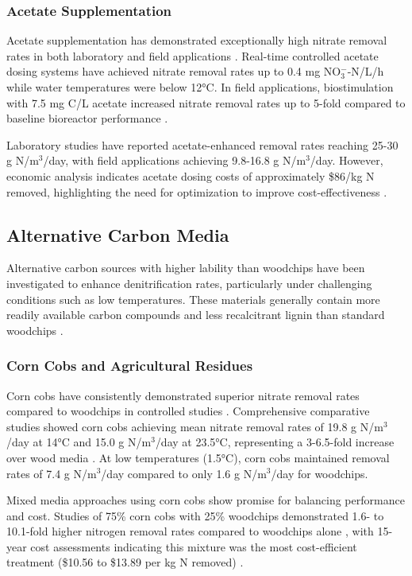 \documentclass[12pt,a4paper]{article}
\begin{document}
\subsubsection{Acetate Supplementation}

Acetate supplementation has demonstrated exceptionally high nitrate removal rates in both laboratory and field applications \citep{RN242}. Real-time controlled acetate dosing systems have achieved nitrate removal rates up to 0.4 mg NO$_3^-$-N/L/h while water temperatures were below 12°C. In field applications, biostimulation with 7.5 mg C/L acetate increased nitrate removal rates up to 5-fold compared to baseline bioreactor performance \citep{RN242}.

Laboratory studies have reported acetate-enhanced removal rates reaching 25-30 g N/m$^3$/day, with field applications achieving 9.8-16.8 g N/m$^3$/day. However, economic analysis indicates acetate dosing costs of approximately \$86/kg N removed, highlighting the need for optimization to improve cost-effectiveness \citep{RN242}.

\subsection{Alternative Carbon Media}

Alternative carbon sources with higher lability than woodchips have been investigated to enhance denitrification rates, particularly under challenging conditions such as low temperatures. These materials generally contain more readily available carbon compounds and less recalcitrant lignin than standard woodchips \citep{new_ref_2}.

\subsubsection{Corn Cobs and Agricultural Residues}

Corn cobs have consistently demonstrated superior nitrate removal rates compared to woodchips in controlled studies \citep{new_ref_2}. Comprehensive comparative studies showed corn cobs achieving mean nitrate removal rates of 19.8 g N/m$^3$/day at 14°C and 15.0 g N/m$^3$/day at 23.5°C, representing a 3-6.5-fold increase over wood media \citep{new_ref_2}. At low temperatures (1.5°C), corn cobs maintained removal rates of 7.4 g N/m$^3$/day compared to only 1.6 g N/m$^3$/day for woodchips.

Mixed media approaches using corn cobs show promise for balancing performance and cost. Studies of 75\% corn cobs with 25\% woodchips demonstrated 1.6- to 10.1-fold higher nitrogen removal rates compared to woodchips alone \citep{new_ref_4}, with 15-year cost assessments indicating this mixture was the most cost-efficient treatment (\$10.56 to \$13.89 per kg N removed) \citep{new_ref_4}.
\end{document}
